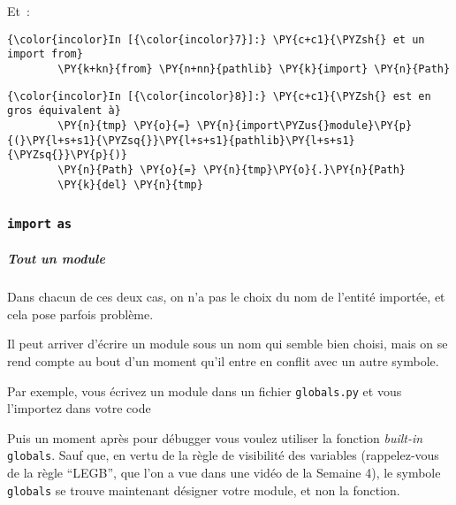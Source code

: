     Et~:

    \begin{Verbatim}[commandchars=\\\{\},frame=single,framerule=0.3mm,rulecolor=\color{cellframecolor}]
{\color{incolor}In [{\color{incolor}7}]:} \PY{c+c1}{\PYZsh{} et un import from}
        \PY{k+kn}{from} \PY{n+nn}{pathlib} \PY{k}{import} \PY{n}{Path}
\end{Verbatim}


    \begin{Verbatim}[commandchars=\\\{\},frame=single,framerule=0.3mm,rulecolor=\color{cellframecolor}]
{\color{incolor}In [{\color{incolor}8}]:} \PY{c+c1}{\PYZsh{} est en gros équivalent à}
        \PY{n}{tmp} \PY{o}{=} \PY{n}{import\PYZus{}module}\PY{p}{(}\PY{l+s+s1}{\PYZsq{}}\PY{l+s+s1}{pathlib}\PY{l+s+s1}{\PYZsq{}}\PY{p}{)}
        \PY{n}{Path} \PY{o}{=} \PY{n}{tmp}\PY{o}{.}\PY{n}{Path}
        \PY{k}{del} \PY{n}{tmp}
\end{Verbatim}


    \hypertarget{import-as}{%
\subsubsection{\texorpdfstring{\texttt{import}
\texttt{as}}{import as}}\label{import-as}}

    \hypertarget{tout-un-module}{%
\subparagraph{Tout un module}\label{tout-un-module}}

    Dans chacun de ces deux cas, on n'a pas le choix du nom de l'entité
importée, et cela pose parfois problème.

Il peut arriver d'écrire un module sous un nom qui semble bien choisi,
mais on se rend compte au bout d'un moment qu'il entre en conflit avec
un autre symbole.

Par exemple, vous écrivez un module dans un fichier \texttt{globals.py}
et vous l'importez dans votre code

    \begin{Shaded}
\begin{Highlighting}[frame=lines,framerule=0.6mm,rulecolor=\color{asisframecolor}]
 
\end{Highlighting}
\end{Shaded}

    Puis un moment après pour débugger vous voulez utiliser la fonction
\emph{built-in} \texttt{globals}. Sauf que, en vertu de la règle de
visibilité des variables (rappelez-vous de la règle ``LEGB'', que l'on a
vue dans une vidéo de la Semaine 4), le symbole \texttt{globals} se
trouve maintenant désigner votre module, et non la fonction.

